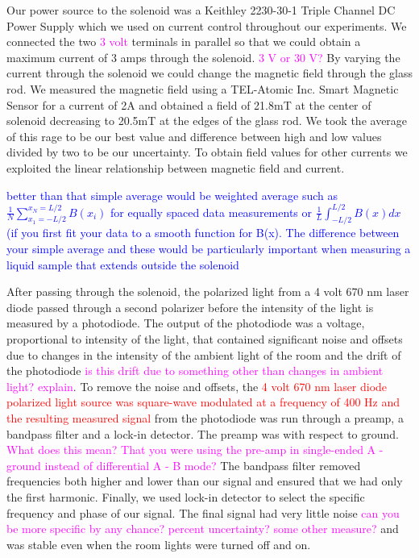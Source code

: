 \documentclass[prb,preprint]{revtex4-1}
\begin{document}
Our power source to the solenoid was a Keithley 2230-30-1 Triple Channel DC Power Supply which we used on current control throughout our experiments. We connected the two \textcolor{magenta}{3 volt}  terminals in parallel so that we could obtain a maximum current of 3 amps through the solenoid. \textcolor{magenta}{3 V or 30 V?} By varying the current through the solenoid we could change the magnetic field through the glass rod. We measured the magnetic field using a TEL-Atomic Inc. Smart Magnetic Sensor for a current of 2A and obtained a field of 21.8mT at the center of solenoid decreasing to 20.5mT at the edges of the glass rod. We took the average of this rage to be our best value and difference between high and low values divided by two to be our uncertainty. To obtain field values for other currents we exploited the linear relationship between magnetic field and current.


\textcolor{blue}{better than that simple average would be weighted average such as $\frac{1}{N} \sum_{x_1=-L/2}^{x_N = L/2}B(x_i)$  for equally spaced data measurements or  $\frac{1}{L} \int_{-L/2}^{L/2}B(x)dx$ (if you first fit your data to a smooth function for B(x). The difference between your simple average and these would be particularly important when measuring a liquid sample that extends outside the solenoid}


After passing through the solenoid, the polarized light from a 4 volt 670 nm laser diode passed through a second polarizer before the intensity of the light is measured by a photodiode. The output of the photodiode was a voltage, proportional to intensity of the light, that contained significant noise and offsets due to changes in the intensity of the ambient light of the room and the drift of the photodiode \textcolor{magenta}{is this drift due to something other than changes in ambient light? explain}.  To remove the noise and offsets, the \textcolor{red}{4 volt 670 nm laser diode polarized light source was square-wave modulated at a frequency of 400 Hz and the resulting measured signal} from the photodiode was run through a preamp, a bandpass filter and a lock-in detector. The preamp  was with respect to ground. \textcolor{magenta}{What does this mean? That you were using the pre-amp in single-ended A - ground instead of differential A - B mode?} The bandpass filter removed frequencies both higher and lower than our signal and ensured that we had only the first harmonic. Finally, we used lock-in detector to select the specific frequency and phase of our signal. The final signal had very little noise \textcolor{magenta}{can you be more specific by any chance? percent uncertainty? some other measure? } and was stable even when the room lights were turned off and on. 
\end{document}
